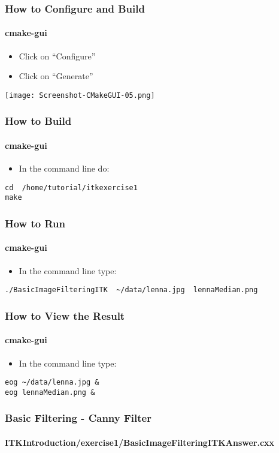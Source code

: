 \begin{frame}[fragile]
\frametitle{How to Configure and Build}
\framesubtitle{cmake-gui}
\begin{itemize}
\item Click on ``Configure''
\item Click on ``Generate''
\end{itemize}
\begin{center}
  \texttt{[image: Screenshot-CMakeGUI-05.png]}
\end{center}
\end{frame}

\begin{frame}[fragile]
\frametitle{How to Build}
\framesubtitle{cmake-gui}
\begin{itemize}
\item In the command line do:
\end{itemize}
\begin{verbatim}
cd  /home/tutorial/itkexercise1
make
\end{verbatim}
\end{frame}

\begin{frame}[fragile]
\frametitle{How to Run}
\framesubtitle{cmake-gui}
\begin{itemize}
\item In the command line type:
\end{itemize}
\begin{verbatim}
./BasicImageFilteringITK  ~/data/lenna.jpg  lennaMedian.png
\end{verbatim}
\end{frame}

\begin{frame}[fragile]
\frametitle{How to View the Result}
\framesubtitle{cmake-gui}
\begin{itemize}
\item In the command line type:
\end{itemize}
\begin{verbatim}
eog ~/data/lenna.jpg &
eog lennaMedian.png &
\end{verbatim}
\end{frame}


\begin{frame}
\frametitle{Basic Filtering - Canny Filter}
\framesubtitle{ITKIntroduction/exercise1/BasicImageFilteringITKAnswer.cxx}
\end{frame}

